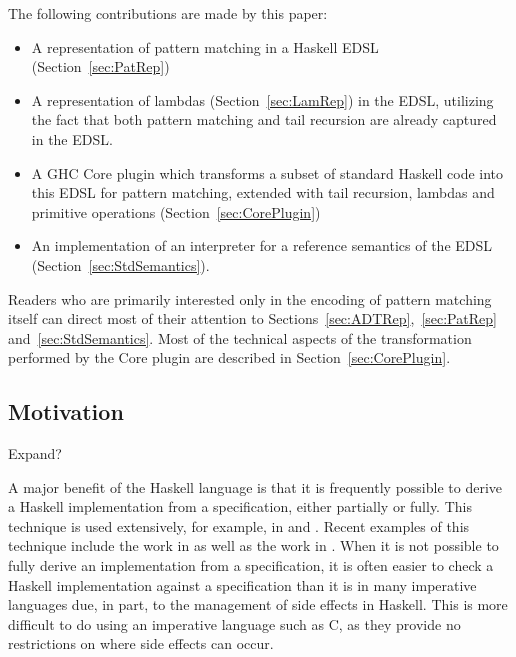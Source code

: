 \documentclass[runningheads, a4paper]{llncs}
\newenvironment{todont}
               {\comment}
               {\endcomment}
\begin{document}
The following contributions are made by this paper:

\begin{itemize}
  \item A representation of pattern matching in a Haskell EDSL (Section~\ref{sec:PatRep})
  \item A representation of lambdas (Section~\ref{sec:LamRep}) in the EDSL, utilizing
  the fact that both pattern matching and tail recursion are already captured in
  the EDSL.
  \item A GHC Core plugin which transforms a subset of standard Haskell code
  into this EDSL for pattern matching, extended with tail recursion,
  lambdas and primitive operations (Section~\ref{sec:CorePlugin})
  \item An implementation of an interpreter for a reference semantics of the EDSL (Section~\ref{sec:StdSemantics}).
\end{itemize}


Readers who are primarily interested only in the encoding of pattern matching itself can direct
most of their attention to Sections~\ref{sec:ADTRep},~\ref{sec:PatRep} and~\ref{sec:StdSemantics}. Most of the technical aspects of
the transformation performed by the Core plugin are described in Section~\ref{sec:CorePlugin}.

\subsection{Motivation}

\begin{todont}
  Expand?
\end{todont}

A major benefit of the Haskell language is that it is frequently possible to derive
a Haskell implementation from a specification, either partially or fully.  This
technique is used extensively, for example, in \cite{Bird:2010:Pearls} and
\cite{Gibbons:2002:Calc}.  Recent examples of this technique include the work in
\cite{Elliott-2018-ad-icfp} as well as the work in
\cite{Elliott2019-convolution-extended}.  When it is not possible to fully
derive an implementation from a specification, it is often easier to check a
Haskell implementation against a specification than it is in many imperative
languages due, in part, to the management of side effects in Haskell. This is
more difficult to do using an imperative language such as C, as they provide no
restrictions on where side effects can occur.
\end{document}
